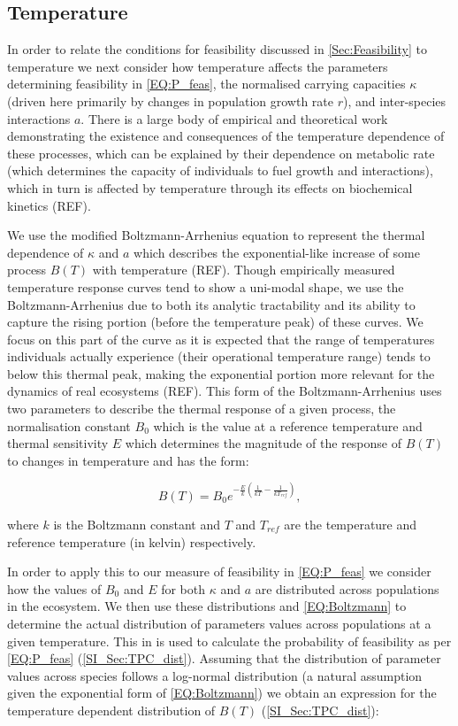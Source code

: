\documentclass{article}
\begin{document}
\subsection{Temperature} \label{SEC:Temperature}
In order to relate the conditions for feasibility discussed in \cref{Sec:Feasibility} to temperature we next consider how temperature affects the parameters determining feasibility in \cref{EQ:P_feas}, the normalised carrying capacities $\kappa$ (driven here primarily by changes in population growth rate $r$), and inter-species interactions $a$. There is a large body of empirical and theoretical work demonstrating the existence and consequences of the temperature dependence of these processes, which can be explained by their dependence on metabolic rate (which determines the capacity of individuals to fuel growth and interactions), which in turn is affected by temperature through its effects on biochemical kinetics (REF).

We use the modified Boltzmann-Arrhenius equation to represent the thermal dependence of $\kappa$ and $a$ which describes the exponential-like increase of some process $B(T)$ with temperature (REF). Though empirically measured temperature response curves tend to show a uni-modal shape, we use the Boltzmann-Arrhenius due to both its analytic tractability and its ability to capture the rising portion (before the temperature peak) of these curves. We focus on this part of the curve as it is expected that the range of temperatures individuals actually experience (their operational temperature range) tends to below this thermal peak, making the exponential portion more relevant for the dynamics of real ecosystems (REF). This form of the Boltzmann-Arrhenius uses two parameters to describe the thermal response of a given process, the normalisation constant $B_0$ which is the value at a reference temperature and thermal sensitivity $E$ which determines the magnitude of the response of $B(T)$ to changes in temperature and has the form:

\begin{equation} \label{EQ:Boltzmann}
    B(T) = B_0 e^{-\frac{E}{k} \left(\frac{1}{kT} - \frac{1}{k T_{ref} }\right)},
\end{equation}

where $k$ is the Boltzmann constant and $T$ and $T_{ref}$ are the temperature and reference temperature (in kelvin) respectively. 

In order to apply this to our measure of feasibility in \cref{EQ:P_feas} we consider how the values of $B_0$ and $E$ for both $\kappa$ and $a$ are distributed across populations in the ecosystem. We then use these distributions and \cref{EQ:Boltzmann} to determine the actual distribution of parameters values across populations at a given temperature. This in is used to calculate the probability of feasibility as per \cref{EQ:P_feas} (\cref{SI_Sec:TPC_dist}). Assuming that the distribution of parameter values across species follows a log-normal distribution (a natural assumption given the exponential form of \cref{EQ:Boltzmann}) we obtain an expression for the temperature dependent distribution of $B(T)$ (\cref{SI_Sec:TPC_dist}):
\end{document}
